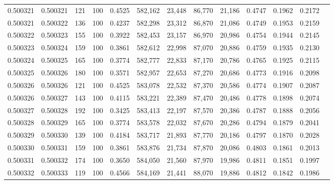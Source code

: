 \begin{tabular}{rrrrrrrrrrrrr}
0.500321 & 0.500321 &   121 & 100 &                                     0.4525 & 582,162 &  23,448 &  86,770 &  21,186 & 0.4747 & 0.1962 & 0.2172 \\
0.500321 & 0.500322 &   136 & 100 &                                     0.4237 & 582,298 &  23,312 &  86,870 &  21,086 & 0.4749 & 0.1953 & 0.2159 \\
0.500322 & 0.500323 &   155 & 100 &                                     0.3922 & 582,453 &  23,157 &  86,970 &  20,986 & 0.4754 & 0.1944 & 0.2145 \\
0.500323 & 0.500324 &   159 & 100 &                                     0.3861 & 582,612 &  22,998 &  87,070 &  20,886 & 0.4759 & 0.1935 & 0.2130 \\
0.500324 & 0.500325 &   165 & 100 &                                     0.3774 & 582,777 &  22,833 &  87,170 &  20,786 & 0.4765 & 0.1925 & 0.2115 \\
0.500325 & 0.500326 &   180 & 100 &                                     0.3571 & 582,957 &  22,653 &  87,270 &  20,686 & 0.4773 & 0.1916 & 0.2098 \\
0.500326 & 0.500326 &   121 & 100 &                                     0.4525 & 583,078 &  22,532 &  87,370 &  20,586 & 0.4774 & 0.1907 & 0.2087 \\
0.500326 & 0.500327 &   143 & 100 &                                     0.4115 & 583,221 &  22,389 &  87,470 &  20,486 & 0.4778 & 0.1898 & 0.2074 \\
0.500327 & 0.500328 &   192 & 100 &                                     0.3425 & 583,413 &  22,197 &  87,570 &  20,386 & 0.4787 & 0.1888 & 0.2056 \\
0.500328 & 0.500329 &   165 & 100 &                                     0.3774 & 583,578 &  22,032 &  87,670 &  20,286 & 0.4794 & 0.1879 & 0.2041 \\
0.500329 & 0.500330 &   139 & 100 &                                     0.4184 & 583,717 &  21,893 &  87,770 &  20,186 & 0.4797 & 0.1870 & 0.2028 \\
0.500330 & 0.500331 &   159 & 100 &                                     0.3861 & 583,876 &  21,734 &  87,870 &  20,086 & 0.4803 & 0.1861 & 0.2013 \\
0.500331 & 0.500332 &   174 & 100 &                                     0.3650 & 584,050 &  21,560 &  87,970 &  19,986 & 0.4811 & 0.1851 & 0.1997 \\
0.500332 & 0.500333 &   119 & 100 &                                     0.4566 & 584,169 &  21,441 &  88,070 &  19,886 & 0.4812 & 0.1842 & 0.1986 \\

\end{tabular}
